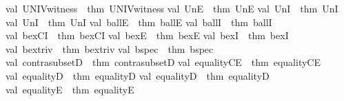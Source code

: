 \begin{isabellebody}
val\ UNIV{\isacharunderscore}{\kern0pt}witness\ {\isacharequal}{\kern0pt}\ {\isacharat}{\kern0pt}{\isacharbraceleft}{\kern0pt}thm\ UNIV{\isacharunderscore}{\kern0pt}witness{\isacharbraceright}{\kern0pt}\isanewline
val\ UnE\ {\isacharequal}{\kern0pt}\ {\isacharat}{\kern0pt}{\isacharbraceleft}{\kern0pt}thm\ UnE{\isacharbraceright}{\kern0pt}\isanewline
val\ UnI{}\ {\isacharequal}{\kern0pt}\ {\isacharat}{\kern0pt}{\isacharbraceleft}{\kern0pt}thm\ UnI{}{\isacharbraceright}{\kern0pt}\isanewline
val\ UnI{}\ {\isacharequal}{\kern0pt}\ {\isacharat}{\kern0pt}{\isacharbraceleft}{\kern0pt}thm\ UnI{}{\isacharbraceright}{\kern0pt}\isanewline
val\ ballE\ {\isacharequal}{\kern0pt}\ {\isacharat}{\kern0pt}{\isacharbraceleft}{\kern0pt}thm\ ballE{\isacharbraceright}{\kern0pt}\isanewline
val\ ballI\ {\isacharequal}{\kern0pt}\ {\isacharat}{\kern0pt}{\isacharbraceleft}{\kern0pt}thm\ ballI{\isacharbraceright}{\kern0pt}\isanewline
val\ bexCI\ {\isacharequal}{\kern0pt}\ {\isacharat}{\kern0pt}{\isacharbraceleft}{\kern0pt}thm\ bexCI{\isacharbraceright}{\kern0pt}\isanewline
val\ bexE\ {\isacharequal}{\kern0pt}\ {\isacharat}{\kern0pt}{\isacharbraceleft}{\kern0pt}thm\ bexE{\isacharbraceright}{\kern0pt}\isanewline
val\ bexI\ {\isacharequal}{\kern0pt}\ {\isacharat}{\kern0pt}{\isacharbraceleft}{\kern0pt}thm\ bexI{\isacharbraceright}{\kern0pt}\isanewline
val\ bex{\isacharunderscore}{\kern0pt}triv\ {\isacharequal}{\kern0pt}\ {\isacharat}{\kern0pt}{\isacharbraceleft}{\kern0pt}thm\ bex{\isacharunderscore}{\kern0pt}triv{\isacharbraceright}{\kern0pt}\isanewline
val\ bspec\ {\isacharequal}{\kern0pt}\ {\isacharat}{\kern0pt}{\isacharbraceleft}{\kern0pt}thm\ bspec{\isacharbraceright}{\kern0pt}\isanewline
val\ contra{\isacharunderscore}{\kern0pt}subsetD\ {\isacharequal}{\kern0pt}\ {\isacharat}{\kern0pt}{\isacharbraceleft}{\kern0pt}thm\ contra{\isacharunderscore}{\kern0pt}subsetD{\isacharbraceright}{\kern0pt}\isanewline
val\ equalityCE\ {\isacharequal}{\kern0pt}\ {\isacharat}{\kern0pt}{\isacharbraceleft}{\kern0pt}thm\ equalityCE{\isacharbraceright}{\kern0pt}\isanewline
val\ equalityD{}\ {\isacharequal}{\kern0pt}\ {\isacharat}{\kern0pt}{\isacharbraceleft}{\kern0pt}thm\ equalityD{}{\isacharbraceright}{\kern0pt}\isanewline
val\ equalityD{}\ {\isacharequal}{\kern0pt}\ {\isacharat}{\kern0pt}{\isacharbraceleft}{\kern0pt}thm\ equalityD{}{\isacharbraceright}{\kern0pt}\isanewline
val\ equalityE\ {\isacharequal}{\kern0pt}\ {\isacharat}{\kern0pt}{\isacharbraceleft}{\kern0pt}thm\ equalityE{\isacharbraceright}{\kern0pt}\isanewline

\end{isabellebody}
